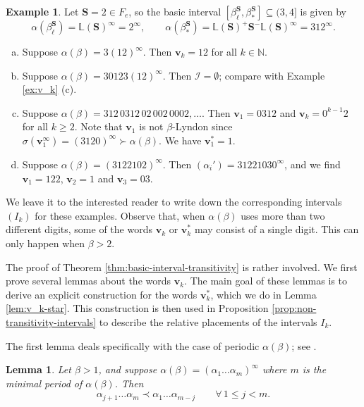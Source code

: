 \documentclass[11pt]{amsart}
\newtheorem{lemma}[theorem]{Lemma}
\theoremstyle{definition}
\newtheorem{example}[theorem]{Example}
\theoremstyle{remark}
\numberwithin{equation}{section}
\newcommand{\N}{\ensuremath{\mathbb{N}}}
\renewcommand{\L}{\ensuremath{\mathbb{L}}}
\newcommand{\cs}{ {\mathbf{S}}}
\renewcommand{\v}{\mathbf{v}}
\newcommand{\f}{\infty}
\newcommand{\al}{\alpha}
\newcommand{\si}{\sigma}
\begin{document}
{
\begin{example} \label{ex:v_k-larger-alphabet}
Let $\cs=2\in F_e$, so the basic interval $[\beta_\ell^{\cs},\beta_*^{\cs}]\subseteq(3,4]$ is given by
\[
\al(\beta_\ell^{\cs})=\L(\cs)^\f=2^\f, \qquad \al(\beta_*^{\cs})=\L(\cs)^+\cs^-\L(\cs)^\f=312^\f.
\]
\begin{enumerate}[(a)]
\item Suppose $\al(\beta)=3(12)^\f$. Then $\v_k=12$ for all $k\in\N$.
\item Suppose $\al(\beta)=30123(12)^\f$. Then $\mathcal{I}=\emptyset$; compare with Example \ref{ex:v_k} (c).
\item Suppose $\al(\beta)=312\,0312\,02\,002\,0002,\dots$. Then $\v_1=0312$ and $\v_k=0^{k-1}2$ for all $k\geq 2$. Note that $\v_1$ is not $\beta$-Lyndon since $\si(\v_1^\f)=(3120)^\f\succ\al(\beta)$. We have $\v_1^*=1$.
\item Suppose $\al(\beta)=(3122102)^\f$. Then $(\al_i')=31221030^\f$, and we find $\v_1=122$, $\v_2=1$ and $\v_3=03$.
\end{enumerate}
We leave it to the interested reader to write down the corresponding intervals $(I_k)$ for these examples. Observe that, when $\al(\beta)$ uses more than two different digits, some of the words $\v_k$ or $\v_k^*$ may consist of a single digit. This can only happen when $\beta>2$. 
\end{example}
}

The proof of Theorem \ref{thm:basic-interval-transitivity} is rather involved.
We first prove several lemmas about the words $\v_k$. { The main goal of these lemmas is to derive an explicit construction for the words $\v_k^*$, which we do in Lemma \ref{lem:v_k-star}. This construction is then used in} Proposition \ref{prop:non-transitivity-intervals} to describe the relative placements of the intervals $I_k$. 

The first lemma deals specifically with the case of periodic $\al(\beta)$; see \cite[Lemma 3.8]{Kalle-Kong-Langeveld-Li-18}.

\begin{lemma} \label{lem:periodic-permutations}
Let $\beta{>1}$, and suppose $\al(\beta)=(\al_1\dots\al_m)^\f$ where $m$ is the minimal period of $\al(\beta)$. Then
\begin{equation*} %
\al_{j+1}\dots\al_m \prec \al_1\dots\al_{m-j} \qquad \forall\,1\leq j<m.
\end{equation*}
\end{lemma}
\end{document}

